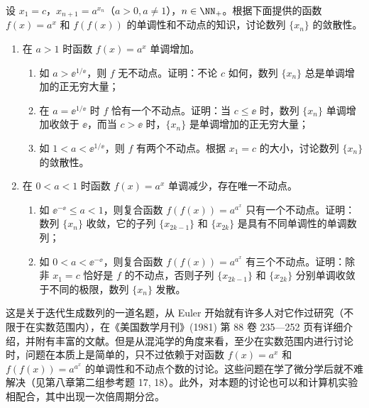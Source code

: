 \begin{xreferenceproblem}[18]
设 $x_1=c$，$x_{n+1}=a^{x_n}$（$a>0,a\ne1$），$n\in\NN_+$。根据下面提供的函数 $f(x)=a^x$ 和 $f(f(x))$ 的单调性和不动点的知识，讨论数列 $\{x_n\}$ 的敛散性。
  \begin{enumerate}[label=(\arabic*)]
    \item 在 $a>1$ 时函数 $f(x)=a^x$ 单调增加。
    \begin{enumerate}[label=(\roman*)]
      \item 如 $a>\ee^{1/\ee}$，则 $f$ 无不动点。证明：不论 $c$ 如何，数列 $\{x_n\}$ 总是单调增加的正无穷大量；
      \item 在 $a=\ee^{1/\ee}$ 时 $f$ 恰有一个不动点。证明：当 $c\le\ee$ 时，数列 $\{x_n\}$ 单调增加收敛于 $\ee$，而当 $c>\ee$ 时，$\{x_n\}$ 是单调增加的正无穷大量；
      \item 如 $1<a<\ee^{1/\ee}$，则 $f$ 有两个不动点。根据 $x_1=c$ 的大小，讨论数列 $\{x_n\}$ 的敛散性。
    \end{enumerate}
    \item 在 $0<a<1$ 时函数 $f(x)=a^x$ 单调减少，存在唯一不动点。
    \begin{enumerate}[label=(\roman*)]
      \item 如 $\ee^{-\ee}\le a<1$，则复合函数 $f(f(x))=a^{a^x}$ 只有一个不动点。证明：数列 $\{x_n\}$ 收敛，它的子列 $\{x_{2k-1}\}$ 和 $\{x_{2k}\}$ 是具有不同单调性的单调数列；
      \item 如 $0<a<\ee^{-\ee}$，则复合函数 $f(f(x))=a^{a^x}$ 有三个不动点。证明：除非 $x_1=c$ 恰好是 $f$ 的不动点，否则子列 $\{x_{2k-1}\}$ 和 $\{x_{2k}\}$ 分别单调收敛于不同的极限，数列 $\{x_n\}$ 发散。
    \end{enumerate}
  \end{enumerate}

  \begin{xremark}
  这是关于迭代生成数列的一道名题，从 Euler 开始就有许多人对它作过研究（不限于在实数范围内），在《美国数学月刊》(1981) 第 88 卷 235—252 页有详细介绍，并附有丰富的文献。但是从混沌学的角度来看，至少在实数范围内进行讨论时，问题在本质上是简单的，只不过依赖于对函数 $f(x)=a^x$ 和 $f(f(x))=a^{a^x}$ 的单调性和不动点个数的讨论。这些问题在学了微分学后就不难解决（见第八章第二组参考题 17, 18）。此外，对本题的讨论也可以和计算机实验相配合，其中出现一次倍周期分岔。
  \end{xremark}
\end{xreferenceproblem}

